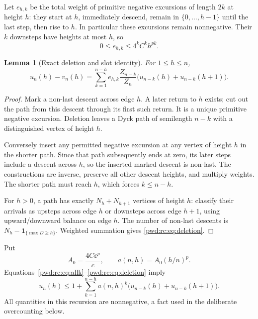 \documentclass[11pt,letterpaper]{article}
\numberwithin{equation}{section}
\newtheorem{lemma}[theorem]{Lemma}
\theoremstyle{remark}\newtheorem{remark}[theorem]{Remark}
\begin{document}
Let $e_{h,k}$ be the total weight of primitive negative excursions of length $2k$ at height $h$: they start at $h$, immediately descend, remain in $\{0,\ldots,h-1\}$ until the last step, then rise to $h$. In particular these excursions remain nonnegative. Their $k$ downsteps have heights at most $h$, so
\begin{equation}\label{pwd:rc:eq:excursion-bound}
 0\le e_{h,k}\le4^kC^kh^{pk}.
\end{equation}

\begin{lemma}[Exact deletion and slot identity]\label{pwd:rc:lem:deletion}
For $1\le h\le n$,
\begin{equation}\label{pwd:rc:eq:deletion}
 u_n(h)-v_n(h)=\sum_{k=1}^{n-h}e_{h,k}\frac{Z_{n-k}}{Z_n}
 \bigl(u_{n-k}(h)+u_{n-k}(h+1)\bigr).
\end{equation}
\end{lemma}
\begin{proof}
Mark a non-last descent across edge $h$. A later return to $h$ exists; cut out the path from this descent through its first such return. It is a unique primitive negative excursion. Deletion leaves a Dyck path of semilength $n-k$ with a distinguished vertex of height $h$.

Conversely insert any permitted negative excursion at any vertex of height $h$ in the shorter path. Since that path subsequently ends at zero, its later steps include a descent across $h$, so the inserted marked descent is non-last. The constructions are inverse, preserve all other descent heights, and multiply weights. The shorter path must reach $h$, which forces $k\le n-h$.

For $h>0$, a path has exactly $N_h+N_{h+1}$ vertices of height $h$: classify their arrivals as upsteps across edge $h$ or downsteps across edge $h+1$, using upward/downward balance on edge $h$. The number of non-last descents is $N_h-\mathbf1_{\{\max D\ge h\}}$. Weighted summation gives \eqref{pwd:rc:eq:deletion}.
\end{proof}
Put
\begin{equation}\label{pwd:rc:eq:A-a}
 A_0=\frac{4C\ee^p}{c},\qquad a(n,h)=A_0(h/n)^p.
\end{equation}
Equations~\eqref{pwd:rc:eq:allk}--\eqref{pwd:rc:eq:deletion} imply
\begin{equation}\label{pwd:rc:eq:cone-recursion}
 u_n(h)\le1+\sum_{k=1}^{n-h}a(n,h)^k
 \bigl(u_{n-k}(h)+u_{n-k}(h+1)\bigr).
\end{equation}
All quantities in this recursion are nonnegative, a fact used in the deliberate overcounting below.
\end{document}
